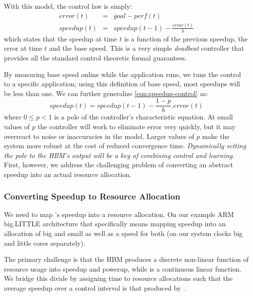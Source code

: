 With this model, the control law is simply:
\begin{eqnarray}
  error(t) &=& goal - perf(t) \label{eqn:speedup-error} \\
  speedup(t) &=& speedup(t-1) - \frac{error(t)}{b}
  \label{eqn:speedup-control}
\end{eqnarray}
which states that the speedup at time $t$ is a function of the
previous speedup, the error at time $t$ and the base speed.  This is a
very simple \emph{deadbeat} controller that provides all the standard
control theoretic formal guarantees.


By measuring base speed online while the application runs, we tune the
control to a specific application; using this definition of base
speed, most speedups will be less than one.  We can further generalize
\eqref{eqn:speedup-control} as:
\begin{equation}
speedup(t) = speedup(t-1) - \frac{1 - p}{b}.error(t)
\end{equation}
where $0 \le p < 1$ is a pole of the controller's characteristic
equation.  At small values of $p$ the controller will work to
eliminate error very quickly, but it may overreact to noise or
inaccuracies in the model.  Larger values of $p$ make the system more
robust at the cost of reduced convergence time.  \emph{Dynamically
  setting the pole to the HBM's output will be a key of combining
  control and learning.} First, however, we address the challenging
problem of converting an abstract speedup into an actual resource
allocation.


\subsubsection{Converting Speedup to Resource Allocation}
We need to map 's speedup into a resource
allocation.  On our example ARM big.LITTLE architecture that
specifically means mapping speedup into an allocation of big and small
as well as a speed for both (on our system clocks big and little cores
separately).

The primary challenge is that the HBM produces a discrete non-linear
function of resource usage into speedup and powerup, while
 is a continuous linear function.  We bridge
this divide by assigning time to resource allocations such that the
average speedup over a control interval is that produced by
.

